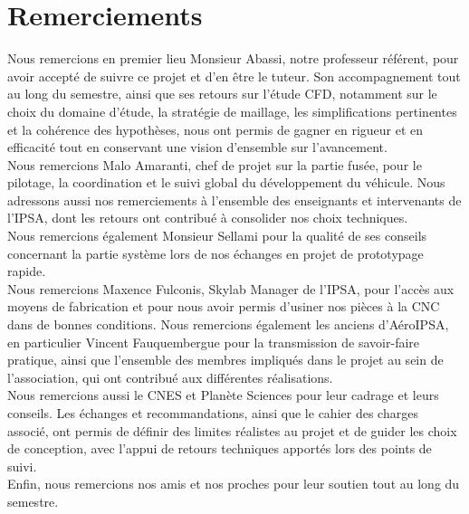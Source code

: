 \section*{Remerciements}

Nous remercions en premier lieu Monsieur Abassi, notre professeur référent, pour avoir accepté de suivre ce projet et d’en être
le tuteur. Son accompagnement tout au long du semestre, ainsi que ses retours sur l’étude \acrshort{CFD}, notamment sur le choix
du domaine d’étude, la stratégie de maillage, les simplifications pertinentes et la cohérence des hypothèses, nous ont permis de
gagner en rigueur et en efficacité tout en conservant une vision d’ensemble sur l’avancement.\\

Nous remercions Malo Amaranti, chef de projet sur la partie fusée, pour le pilotage, la coordination et le suivi global du
développement du véhicule. Nous adressons aussi nos remerciements à l’ensemble des enseignants et intervenants de
l’\acrshort{IPSA}, dont les retours ont contribué à consolider nos choix techniques.\\

Nous remercions également Monsieur Sellami pour la qualité de ses conseils concernant la partie système lors de nos échanges en
projet de prototypage rapide. \\

Nous remercions Maxence Fulconis, \gls{Skylab} Manager de l’\acrshort{IPSA}, pour l’accès aux moyens de fabrication et pour
nous avoir permis d’usiner nos pièces à la \acrshort{CNC} dans de bonnes conditions. Nous remercions également les anciens
d’AéroIPSA, en particulier Vincent Fauquembergue pour la transmission de savoir-faire pratique, ainsi que l’ensemble des
membres impliqués dans le projet au sein de l’association, qui ont contribué aux différentes réalisations.\\

Nous remercions aussi le \acrshort{CNES} et \gls{Planète Sciences} pour leur cadrage et leurs conseils. Les échanges et
recommandations, ainsi que le cahier des charges associé, ont permis de définir des limites réalistes au projet et de guider
les choix de conception, avec l’appui de retours techniques apportés lors des points de suivi.\\

Enfin, nous remercions nos amis et nos proches pour leur soutien tout au long du semestre.

\newpage
